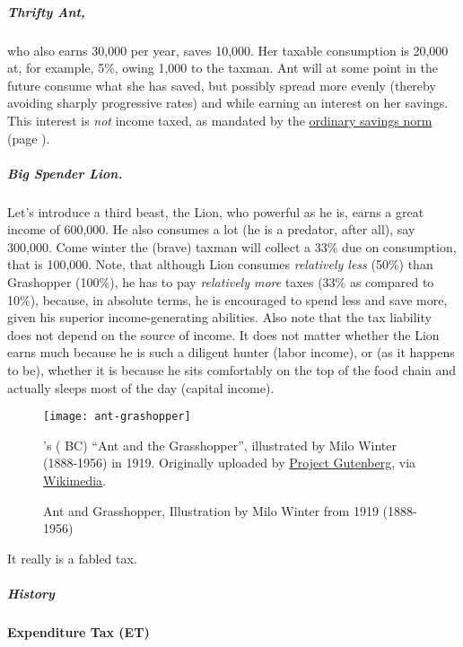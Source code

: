\subparagraph{Thrifty Ant,}
who also earns 30,000 per year, saves 10,000.
Her taxable consumption is 20,000 at, for example, 5\%, owing 1,000 to the taxman.
Ant will at some point in the future consume what she has saved, but possibly spread more evenly (thereby avoiding sharply progressive rates) and while earning an interest on her savings.
This interest is \emph{not} income taxed, as mandated by the \hyperref[sec:savings-norms]{ordinary savings norm} (page \pageref{sec:savings-norms}).

\subparagraph{Big Spender Lion.}
Let's introduce a third beast, the Lion, who powerful as he is, earns a great income of 600,000.
He also consumes a lot (he is a predator, after all), say 300,000.
Come winter the (brave) taxman will collect a 33\% due on consumption, that is 100,000.
Note, that although Lion consumes \emph{relatively less} (50\%) than Grashopper (100\%), he has to pay \emph{relatively more} taxes (33\% as compared to 10\%), because, in absolute terms, he is encouraged to spend less and save more, given his superior income-generating abilities.
Also note that the tax liability does not depend on the source of income.
It does not matter whether the Lion earns much because he is such a diligent hunter (labor income), or (as it happens to be), whether it is because he sits comfortably on the top of the food chain and actually sleeps most of the day (capital income).

\begin{figure}[htbp]
	\centering
	\label{fig:ant-grashopper}
	\texttt{[image: ant-grashopper]}
	\caption[Ant and Grashopper]{Ant and Grasshopper, Illustration by Milo Winter from 1919 (1888-1956)}
	\begin{flushleft}
		\scriptsize{\citeauthor{Aesop}'s (\citeyear{Aesop} BC) ``Ant and the Grasshopper'', illustrated by Milo Winter (1888-1956) in 1919.
Originally uploaded by \href{http://www.gutenberg.org/etext/19994}{Project Gutenberg}, via \href{http://commons.wikimedia.org/wiki/File:The-Ant-and-the-Grasshopper---Project-Gutenberg-etext-19994.jpg}{Wikimedia}}.
	\end{flushleft}
\end{figure}

It really is a fabled tax.

\subparagraph{History}

\paragraph{Expenditure Tax (ET)}
	\label{sec:ET}

